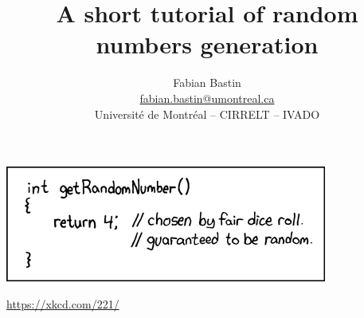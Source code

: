 \documentclass{beamer}
\title[Random Numbers Generation]{A short tutorial of random numbers generation}
\author[Fabian Bastin]{Fabian Bastin \\ \url{fabian.bastin@umontreal.ca} \\ Université de Montréal -- CIRRELT -- IVADO}
\date{}
\begin{document}
	
	\frame{\titlepage}
	
\begin{frame}

\begin{center}
	\href{https://xkcd.com/221/}{\includegraphics[scale=0.75]{imgs/random_number.png}}
\begin{small}
	\url{https://xkcd.com/221/}
\end{small}
\end{center}





\end{frame}
	
\end{document}
